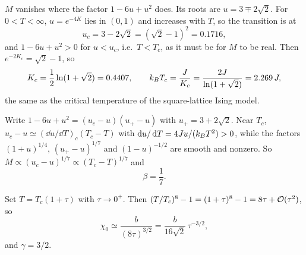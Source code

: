  $M$ vanishes where the factor $1-6u+u^2$ does. Its roots are $u = 3\mp 2\sqrt2$. For $0<T<\infty$,
$u = e^{-4K}$ lies in $(0,1)$ and increases with $T$, so the transition is at
\begin{equation}
  u_c = 3-2\sqrt2 = (\sqrt2-1)^2 = 0.1716 ,
\end{equation}
and $1-6u+u^2>0$ for $u<u_c$, i.e.\ $T<T_c$, as it must be for $M$ to be real. Then $e^{-2K_c} = \sqrt2-1$, so
\begin{equation}
  K_c = \frac{1}{2}\ln(1+\sqrt2) = 0.4407,\qquad k_{B} T_c = \frac{J}{K_c} = \frac{2J}{\ln(1+\sqrt2)} = 2.269\,J ,
\end{equation}
the same as the critical temperature of the square-lattice Ising model.

 Write $1-6u+u^2 = (u_c-u)(u_+-u)$ with $u_+ = 3+2\sqrt2$. Near $T_c$,
$u_c-u\simeq(\dd u/\dd T)_c(T_c-T)$ with $\mathop{}\!\mathrm{d} u/\mathop{}\!\mathrm{d} T = 4Ju/(k_{B} T^2)>0$, while the factors $(1+u)^{1/4}$,
$(u_+-u)^{1/7}$ and $(1-u)^{-1/2}$ are smooth and nonzero. So $M\propto(u_c-u)^{1/7}\propto(T_c-T)^{1/7}$ and
\begin{equation}
  \beta = \frac{1}{7}.
\end{equation}

Set $T = T_c(1+\tau)$ with $\tau\to 0^+$. Then $(T/T_c)^8-1 = (1+\tau)^8-1 = 8\tau+\mathcal{O}(\tau^2)$, so
\begin{equation}
  \chi_0\simeq\frac{b}{(8\tau)^{3/2}} = \frac{b}{16\sqrt2}\,\tau^{-3/2},
\end{equation}
and $\gamma = 3/2$.

